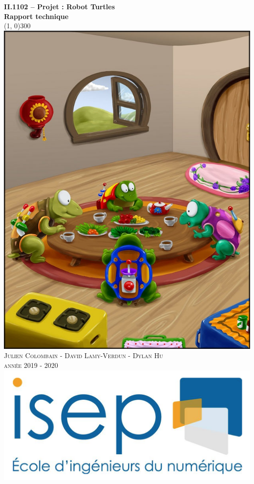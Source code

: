 \documentclass{article}
\begin{document}
\begin{titlepage}
	\begin{center}
		\huge{\bfseries II.1102 – Projet : Robot Turtles} \\
		\huge{\bfseries Rapport technique} \\
		\line(1, 0){300} \\
		[0.5cm]
		\includegraphics[scale=0.4]{../img/background} \\
		[0.5cm]
		\textsc{\large Julien Colombain - David Lamy-Verdun - Dylan Hu} \\
		[0.5cm]
		\textsc{\large année 2019 - 2020} \\
		[0.5cm]
		\includegraphics[scale=0.15]{../img/logoISEP} \\
	\end{center}
\end{titlepage}\cleardoublepage
\end{document}
